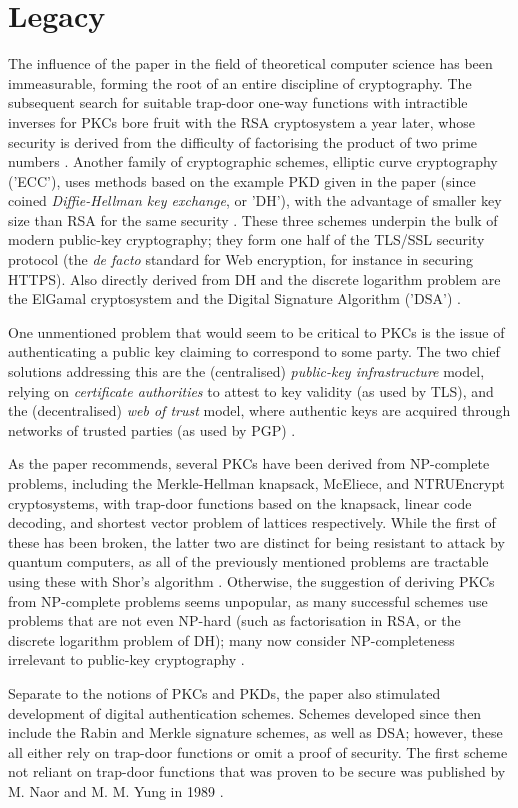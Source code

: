 \documentclass[11pt]{article}
\begin{document}
\section{Legacy}
The influence of the paper in the field of theoretical computer science has been
immeasurable, forming the root of an entire discipline of cryptography.  The
subsequent search for suitable trap-door one-way functions with intractible
inverses for PKCs bore fruit with the RSA cryptosystem a year later, whose
security is derived from the difficulty of factorising the product of two prime
numbers \cite{rivest1978method}. Another family of cryptographic schemes,
elliptic curve cryptography ('ECC'), uses methods based on the example PKD given
in the paper (since coined \textit{Diffie-Hellman key exchange}, or 'DH'), with
the advantage of smaller key size than RSA for the same security
\cite{lopez2000overview}.  These three schemes underpin the bulk of modern
public-key cryptography; they form one half of the TLS/SSL security protocol
(the \textit{de facto} standard for Web encryption, for instance in securing
HTTPS). Also directly derived from DH and the discrete logarithm problem are the
ElGamal cryptosystem and the Digital Signature Algorithm ('DSA')
\cite{dorey2017internet}.
\par
One unmentioned problem that would seem to be critical to PKCs is the issue of
authenticating a public key claiming to correspond to some party. The two chief
solutions addressing this are the (centralised) \textit{public-key
infrastructure} model, relying on \textit{certificate authorities} to attest to
key validity (as used by TLS), and the (decentralised) \textit{web of trust}
model, where authentic keys are acquired through networks of trusted parties (as
used by PGP) \cite{dorey2017internet}.
\par
As the paper recommends, several PKCs have been derived from NP-complete
problems, including the Merkle-Hellman knapsack, McEliece, and NTRUEncrypt
cryptosystems, with trap-door functions based on the knapsack, linear code
decoding, and shortest vector problem of lattices respectively.  While the first
of these has been broken, the latter two are distinct for being resistant to
attack by quantum computers, as all of the previously mentioned problems are
tractable using these with Shor's algorithm \cite{perlner2009quantum}.
Otherwise, the suggestion of deriving PKCs from NP-complete problems seems
unpopular, as many successful schemes use problems that are not even NP-hard
(such as factorisation in RSA, or the discrete logarithm problem of DH); many
now consider NP-completeness irrelevant to public-key cryptography
\cite{papadimitriou1997np}.
\par
Separate to the notions of PKCs and PKDs, the paper also stimulated development
of digital authentication schemes. Schemes developed since then include the
Rabin and Merkle signature schemes, as well as DSA; however, these all either
rely on trap-door functions or omit a proof of security. The first scheme not
reliant on trap-door functions that was proven to be secure was published by M.
Naor and M. M. Yung in 1989 \cite{naor1989universal}.

{\scriptsize

}
\end{document}
